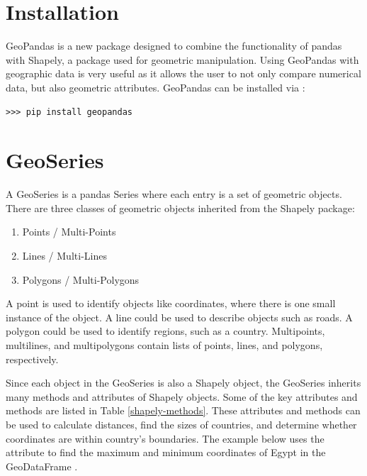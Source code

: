 



\section*{Installation} %
GeoPandas is a new package designed to combine the functionality of pandas with Shapely, a package used for geometric manipulation.
Using GeoPandas with geographic data is very useful as it allows the user to not only compare numerical data, but also geometric attributes.
GeoPandas can be installed via :
\begin{lstlisting}
>>> pip install geopandas
\end{lstlisting}

\section*{GeoSeries} %

A GeoSeries is a pandas Series where each entry is a set of geometric objects.
There are three classes of geometric objects inherited from the Shapely package:
\begin{enumerate}
\item Points / Multi-Points
\item Lines / Multi-Lines
\item Polygons / Multi-Polygons
\end{enumerate}
A point is used to identify objects like coordinates, where there is one small instance of the object.
A line could be used to describe objects such as roads.
A polygon could be used to identify regions, such as a country.
Multipoints, multilines, and multipolygons contain lists of points, lines, and polygons, respectively.

Since each object in the GeoSeries is also a Shapely object, the GeoSeries inherits many methods and attributes of Shapely objects.
Some of the key attributes and methods are listed in Table \ref{shapely-methods}.
These attributes and methods can be used to calculate distances, find the sizes of countries, and determine whether coordinates are within country's boundaries.
The example below uses the attribute  to find the maximum and minimum coordinates of Egypt in the GeoDataFrame .

